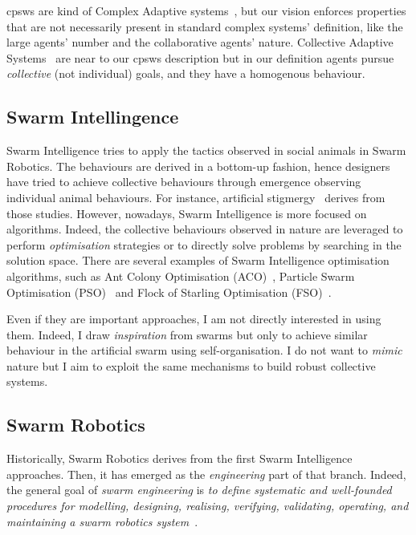 \documentclass[11pt]{article}
\begin{document}
\acp{cpsw} are kind of Complex Adaptive systems~\cite{holland1992complex}, but our vision enforces properties that are not necessarily present in standard complex systems' definition, like the large agents' number and the collaborative agents' nature.
Collective Adaptive Systems~\cite{DBLP:journals/corr/abs-1108-5643} are near to our \acp{cpsw} description but in our definition agents pursue \emph{collective} (not individual) goals, and they have a homogenous behaviour.

\subsection{Swarm Intellingence}

Swarm Intelligence tries to apply the tactics observed in social animals in Swarm Robotics. 
%
The behaviours are derived in a bottom-up fashion, hence designers have tried to achieve collective behaviours through emergence observing individual animal behaviours.
%
For instance, artificial stigmergy~\cite{DBLP:journals/fgcs/DorigoBT00} derives from those studies.
%
However, nowadays, Swarm Intelligence is more focused on algorithms.
% 
Indeed, the collective behaviours observed in nature are leveraged to perform \textit{optimisation} strategies or to directly solve problems by searching in the solution space.
There are several examples of Swarm Intelligence optimisation algorithms, such as Ant Colony Optimisation (ACO)~\cite{DBLP:journals/tsmc/DorigoMC96}, Particle Swarm Optimisation (PSO)~\cite{DBLP:conf/icnn/KennedyE95} and Flock of Starling Optimisation (FSO)~\cite{DBLP:series/sci/FulgineiS11}.

Even if they are important approaches, I am not directly interested in using them. 
%
Indeed, I draw \textit{inspiration} from swarms but only to achieve similar behaviour in the artificial swarm using self-organisation. 
%
I do not want to \textit{mimic} nature but I aim to exploit the same mechanisms to build robust collective systems.

\subsection{Swarm Robotics}

Historically, Swarm Robotics derives from the first Swarm Intelligence approaches. 
%
Then, it has emerged as the \textit{engineering} part of that branch. 
%
Indeed, the general goal of \emph{swarm engineering} is \emph{to define systematic and well-founded procedures for modelling, designing, realising, verifying, validating, operating, and maintaining a swarm robotics system}~\cite{DBLP:journals/swarm/BrambillaFBD13}.
\end{document}
